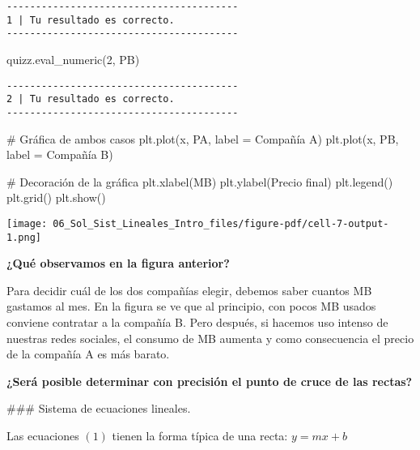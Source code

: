 \documentclass[
  letterpaper,
  DIV=11,
  numbers=noendperiod]{scrreprt}
\newenvironment{Shaded}{\begin{snugshade}}{\end{snugshade}}
\newcommand{\CommentTok}[1]{\textcolor[rgb]{0.37,0.37,0.37}{#1}}
\newcommand{\NormalTok}[1]{\textcolor[rgb]{0.00,0.23,0.31}{#1}}
\newcommand{\OperatorTok}[1]{\textcolor[rgb]{0.37,0.37,0.37}{#1}}
\newcommand{\StringTok}[1]{\textcolor[rgb]{0.13,0.47,0.30}{#1}}
\begin{document}
\begin{verbatim}
----------------------------------------
1 | Tu resultado es correcto.
----------------------------------------
\end{verbatim}

\begin{Shaded}
\begin{Highlighting}[]
\NormalTok{quizz.eval\_numeric(}\StringTok{\textquotesingle{}2\textquotesingle{}}\NormalTok{, PB)}
\end{Highlighting}
\end{Shaded}

\begin{verbatim}
----------------------------------------
2 | Tu resultado es correcto.
----------------------------------------
\end{verbatim}

\begin{Shaded}
\begin{Highlighting}[]
\CommentTok{\# Gráfica de ambos casos}
\NormalTok{plt.plot(x, PA, label }\OperatorTok{=} \StringTok{\textquotesingle{}Compañía A\textquotesingle{}}\NormalTok{)}
\NormalTok{plt.plot(x, PB, label }\OperatorTok{=} \StringTok{\textquotesingle{}Compañía B\textquotesingle{}}\NormalTok{)}

\CommentTok{\# Decoración de la gráfica}
\NormalTok{plt.xlabel(}\StringTok{\textquotesingle{}MB\textquotesingle{}}\NormalTok{)}
\NormalTok{plt.ylabel(}\StringTok{\textquotesingle{}Precio final\textquotesingle{}}\NormalTok{)}
\NormalTok{plt.legend()}
\NormalTok{plt.grid()}
\NormalTok{plt.show()}
\end{Highlighting}
\end{Shaded}

\texttt{[image: 06\_Sol\_Sist\_Lineales\_Intro\_files/figure-pdf/cell-7-output-1.png]}

\textbf{¿Qué observamos en la figura anterior?}

Para decidir cuál de los dos compañías elegir, debemos saber cuantos MB
gastamos al mes. En la figura se ve que al principio, con pocos MB
usados conviene contratar a la compañía B. Pero después, si hacemos uso
intenso de nuestras redes sociales, el consumo de MB aumenta y como
consecuencia el precio de la compañía A es más barato.

\textbf{¿Será posible determinar con precisión el punto de cruce de las
rectas?}

\#\#\# Sistema de ecuaciones lineales.

Las ecuaciones \((1)\) tienen la forma típica de una recta:
\(y = m x + b\)
\end{document}
